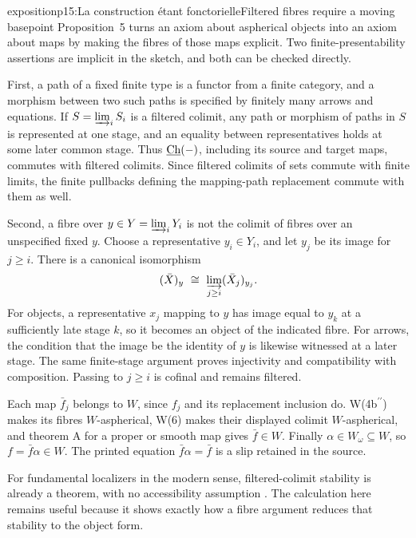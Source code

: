 \begin{dcomment}{exposition}{p15:La construction étant fonctorielle}{Filtered fibres require a moving basepoint}
Proposition~5 turns an axiom about aspherical objects into an axiom about maps by making the fibres of those maps explicit. Two finite-presentability assertions are implicit in the sketch, and both can be checked directly.

First, a path of a fixed finite type is a functor from a finite category, and a morphism between two such paths is specified by finitely many arrows and equations. If \(S=\varinjlim_i S_i\) is a filtered colimit, any path or morphism of paths in \(S\) is represented at one stage, and an equality between representatives holds at some later common stage. Thus \(\underline{\mathrm{Ch}}(-)\), including its source and target maps, commutes with filtered colimits. Since filtered colimits of sets commute with finite limits, the finite pullbacks defining the mapping-path replacement commute with them as well.

Second, a fibre over \(y\in Y=\varinjlim_iY_i\) is not the colimit of fibres over an unspecified fixed \(y\). Choose a representative \(y_i\in Y_i\), and let \(y_j\) be its image for \(j\geq i\). There is a canonical isomorphism
\[
 (\bar X)_y\ \cong\
 \varinjlim_{j\geq i}(\bar X_j)_{y_j}.
\]
For objects, a representative \(x_j\) mapping to \(y\) has image equal to \(y_k\) at a sufficiently late stage \(k\), so it becomes an object of the indicated fibre. For arrows, the condition that the image be the identity of \(y\) is likewise witnessed at a later stage. The same finite-stage argument proves injectivity and compatibility with composition. Passing to \(j\geq i\) is cofinal and remains filtered.

Each map \(\bar f_j\) belongs to \(W\), since \(f_j\) and its replacement inclusion do. W(4b\(^{\prime\prime}\)) makes its fibres \(W\)-aspherical, W(6) makes their displayed colimit \(W\)-aspherical, and theorem A for a proper or smooth map gives \(\bar f\in W\). Finally \(\alpha\in W_\omega\subseteq W\), so \(f=\bar f\alpha\in W\). The printed equation \(\bar f\alpha=\bar f\) is a slip retained in the source.

For fundamental localizers in the modern sense, filtered-colimit stability is already a theorem, with no accessibility assumption \citep[Corollary~4.2.22]{Cisinski2006}. The calculation here remains useful because it shows exactly how a fibre argument reduces that stability to the object form.
\end{dcomment}


